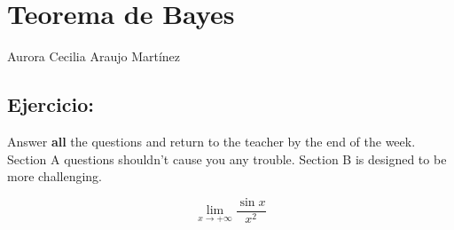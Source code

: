 \documentclass{article}
\begin{document}
\section*{Teorema de Bayes}
Aurora Cecilia Araujo Mart\'inez

\subsection*{Ejercicio:} %
Answer {\bf all} the questions and return to the teacher by the end of the week. Section A questions shouldn't cause you any trouble. Section B is designed to be more challenging.


\begin{equation*}
\lim_{x \to +\infty} \frac{\sin{x}}{x^2}
\end{equation*}
\
\end{document}

